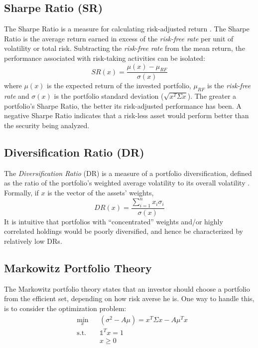 \subsection{Sharpe Ratio (SR)}
The Sharpe Ratio is a measure for calculating risk-adjusted return \cite{sharpe}. The Sharpe Ratio is the average return earned in excess of the \textit{risk-free rate} per unit of volatility or total risk. Subtracting the \textit{risk-free rate} from the mean return, the performance associated with risk-taking activities can be isolated:
\begin{equation}\label{eq:SR}
SR(x) = \frac{\mu(x) - \mu_{RF}}{\sigma(x)}
\end{equation} 
where $\mu(x)$ is the expected return of the invested portfolio, $\mu_{RF}$ is the \textit{risk-free rate} and $\sigma(x)$ is the portfolio standard deviation ($\sqrt{x^T \Sigma x}$). The greater a portfolio's Sharpe Ratio, the better its risk-adjusted performance has been. A negative Sharpe Ratio indicates that a risk-less asset would perform better than the security being analyzed.

\subsection{Diversification Ratio (DR)}
The \textit{Diversification Ratio} (DR) is a measure of a portfolio diversification, defined as the ratio of the portfolio’s weighted
average volatility to its overall volatility \cite{diversification}. Formally, if $x$ is the vector of the assets' weights,
\begin{equation}\label{eq:dr}
DR(x) = \frac{\sum_{i=1}^{n}x_i\sigma_i}{\sigma(x)}
\end{equation}
It is intuitive that portfolios with “concentrated” weights and/or highly correlated holdings would be poorly diversified, and hence be characterized by relatively low DRs.

\subsection{Markowitz Portfolio Theory}
The Markowitz portfolio theory states that an investor should
choose a portfolio from the efficient set, depending on how risk averse he is. One way to handle this, is to consider the optimization problem\footnotemark[1]:
\begin{equation}
\begin{aligned}
&\min_x &&(\sigma^2 - A\mu) = x^T \Sigma x - A\mu^T x\\
&\text{s.t.}&&\mathds{1}^T x=1\\
&&&x \geq 0
\end{aligned}
\end{equation}

